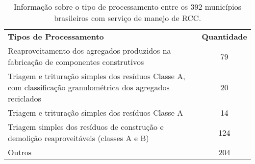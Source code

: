 \begin{table}[htbp]
  \centering
  \caption{Informação sobre o tipo de processamento entre os 392 municípios brasileiros com serviço de manejo de RCC.}
    \begin{tabular}{p{28.07em}|c}
    \rowcolor[rgb]{ .969,  .588,  .275} \textcolor[rgb]{ 1,  1,  1}{\textbf{Tipos de Processamento}} & \multicolumn{1}{p{6.645em}}{\textcolor[rgb]{ 1,  1,  1}{\textbf{Quantidade}}} \\
    \rowcolor[rgb]{ .992,  .914,  .851} Reaproveitamento dos agregados produzidos na fabricação de componentes construtivos & 79 \\
    \rowcolor[rgb]{ .984,  .831,  .706} Triagem e trituração simples dos resíduos Classe A, com classificação granulométrica dos agregados reciclados & 20 \\
    \rowcolor[rgb]{ .992,  .914,  .851} Triagem e trituração simples dos resíduos Classe A & 14 \\
    \rowcolor[rgb]{ .984,  .831,  .706} Triagem simples dos resíduos de construção e demolição reaproveitáveis (classes A e B) & 124 \\
    \rowcolor[rgb]{ .992,  .914,  .851} Outros & 204 \\
    \end{tabular}%
  \label{tab:manejo_rcc}%
\end{table}%
